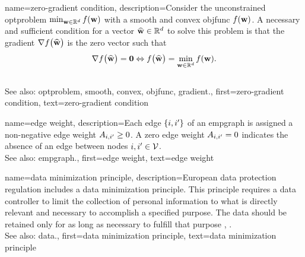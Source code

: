 {name={zero-gradient condition},
	description={Consider the unconstrained 
		\gls{optproblem} $\min_{{\bf w} \in \mathbb{R}^{d}} f({\bf w})$  with 
			a \gls{smooth} and \gls{convex} \gls{objfunc} $f({\bf w})$. A necessary and 
			sufficient condition for a vector $\widehat{{\bf w}} \in \mathbb{R}^{d}$ 
			to solve this problem is that the \gls{gradient} $\nabla f \big( \widehat{{\bf w}} \big)$ 
			is the zero vector such that
			$$\nabla f \big( \widehat{{\bf w}} \big) = \mathbf{0} \Leftrightarrow  f \big( \widehat{{\bf w}} \big) = \min_{{\bf w} \in \mathbb{R}^{d}} f({\bf w}).$$ 
					\\
			See also: \gls{optproblem}, \gls{smooth}, \gls{convex}, \gls{objfunc}, \gls{gradient}.}, 
		first={zero-gradient condition},
		text={zero-gradient condition}
}


{name={edge weight},
	description={Each edge $\{i,i'\}$ of an \gls{empgraph} is 
		assigned a non-negative edge weight $A_{i,i'}\geq0$. 
		A zero edge weight $A_{i,i'}=0$ indicates the absence 
		of an edge between nodes $i, i' \in \mathcal{V}$.
				\\
		See also: \gls{empgraph}.}, 
	first={edge weight},
	text={edge weight}
}


{name={data minimization principle},
	description={European \gls{data} protection regulation 
		includes a \gls{data} minimization principle. This principle requires a \gls{data} controller to 
		limit the collection of personal information to what is directly relevant and necessary 
		to accomplish a specified purpose. The \gls{data} should be retained only for as long as 
		necessary to fulfill that purpose \cite[Article 5(1)(c)]{GDPR2016}, \cite{EURegulation2018}.
				\\
		See also: \gls{data}.}, 
	first={data minimization principle},
	text={data minimization principle}
}


